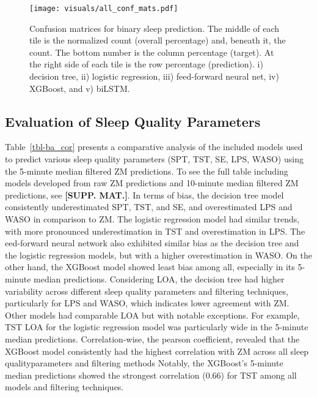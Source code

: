 \documentclass[
  super,
  preprint,
  3p]{elsarticle}
\begin{document}
\begin{figure}[b]

{\centering \texttt{[image: visuals/all\_conf\_mats.pdf]}

}

\caption{\label{fig-conf_mat}Confusion matrices for binary sleep
prediction. The middle of each tile is the normalized count (overall
percentage) and, beneath it, the count. The bottom number is the column
percentage (target). At the right side of each tile is the row
percentage (prediction). i) decision tree, ii) logistic regression, iii)
feed-forward neural net, iv) XGBoost, and v) biLSTM.}

\end{figure}

\hypertarget{evaluation-of-sleep-quality-parameters}{%
\subsection{Evaluation of Sleep Quality
Parameters}\label{evaluation-of-sleep-quality-parameters}}

Table~\ref{tbl-ba_cor} presents a comparative analysis of the included
models used to predict various sleep quality parameters (SPT, TST, SE,
LPS, WASO) using the 5-minute median filtered ZM predictions. To see the
full table including models developed from raw ZM predictions and
10-minute median filtered ZM predictions, see \textbf{{[}SUPP. MAT.{]}}.
In terms of bias, the decision tree model consistently underestimated
SPT, TST, and SE, and overestimated LPS and WASO in comparison to ZM.
The logistic regression model had similar trends, with more pronounced
underestimation in TST and overestimation in LPS. The eed-forward neural
network also exhibited similar bias as the decision tree and the
logistic regression models, but with a higher overestimation in WASO. On
the other hand, the XGBoost model showed least bias among all,
especially in its 5-minute median predictions. Considering LOA, the
decision tree had higher variability across different sleep quality
parameters and filtering techniques, particularly for LPS and WASO,
which indicates lower agreement with ZM. Other models had comparable LOA
but with notable exceptions. For example, TST LOA for the logistic
regression model was particularly wide in the 5-minute median
predictions. Correlation-wise, the pearson coefficient, revealed that
the XGBoost model consistently had the highest correlation with ZM
across all sleep qualityparameters and filtering methods Notably, the
XGBoost's 5-minute median predictions showed the strongest correlation
(0.66) for TST among all models and filtering techniques.
\end{document}
